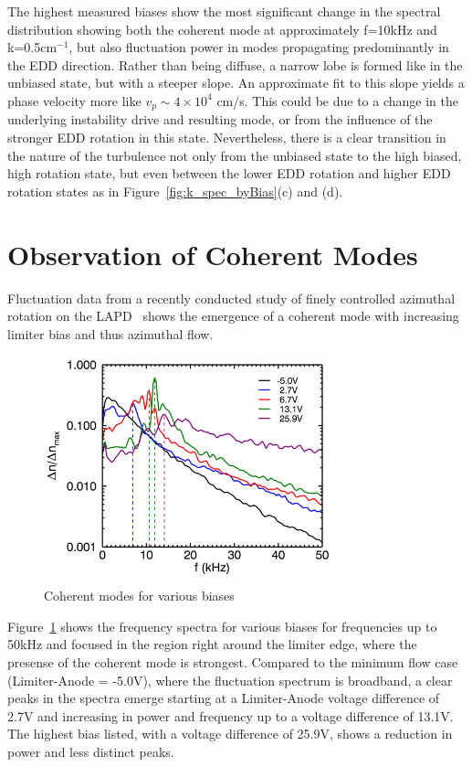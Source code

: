 \documentclass[aip,pop,amsmath,amssymb,reprint,superscriptaddress]{revtex4-1} %
\begin{document}
The highest measured biases show the most significant change in the spectral distribution showing both the coherent mode at approximately f=10kHz and k=0.5$\text{cm}^{-1}$, but also fluctuation power in modes propagating predominantly in the EDD direction. Rather than being diffuse, a narrow lobe is formed like in the unbiased state, but with a steeper slope. An approximate fit to this slope yields a phase velocity more like $v_{p} \sim 4 \times 10^{4}$ cm/s. This could be due to a change in the underlying instability drive and resulting mode, or from the influence of the stronger EDD rotation in this state. Nevertheless, there is a clear transition in the nature of the turbulence not only from the unbiased state to the high biased, high rotation state, but even between the lower EDD rotation and higher EDD rotation states as in Figure~\ref{fig:k_spec_byBias}(c) and (d).

\section{Observation of Coherent Modes}

Fluctuation data from a recently conducted study of finely controlled azimuthal rotation on the LAPD~\cite{schaffner12} shows the emergence of a coherent mode with increasing limiter bias and thus azimuthal flow.

\begin{figure}[!htbp]
\centerline{
\includegraphics[width=8.5cm]{dens_spec_limedge_zoom.png}}%
\caption{\label{fig:dens_spec_limedge_zoom} Coherent modes for various biases}
\end{figure}

Figure~\ref{fig:dens_spec_limedge_zoom} shows the frequency spectra for various biases for frequencies up to 50kHz and focused in the region right around the limiter edge, where the presense of the coherent mode is strongest. Compared to the minimum flow case (Limiter-Anode = -5.0V), where the fluctuation spectrum is broadband, a clear peaks in the spectra emerge starting at a Limiter-Anode voltage difference of 2.7V and increasing in power and frequency up to a voltage difference of 13.1V. The highest bias listed, with a voltage difference of 25.9V, shows a reduction in power and less distinct peaks.
\end{document}
